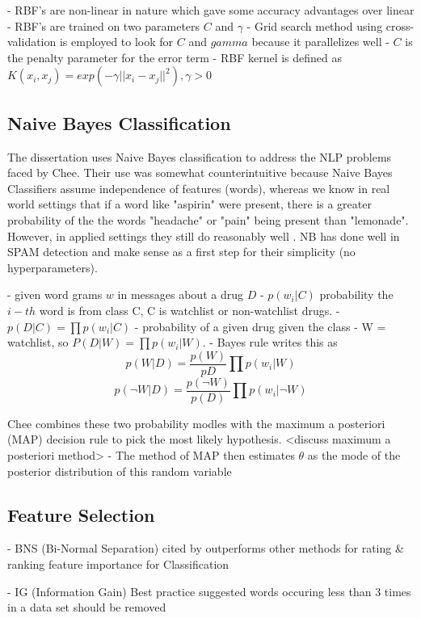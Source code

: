 \documentclass[twoside,11pt]{article}
\begin{document}
- RBF's are non-linear in nature which gave some accuracy advantages over linear
- RBF's are trained on two parameters $C$ and $\gamma$
- Grid search method using cross-validation is employed to look for $C$ and $gamma$
because it parallelizes well
- $C$ is the penalty parameter for the error term
- RBF kernel is defined as $K(x_i, x_j) = exp(-\gamma||x_i - x_j||^{2}), \gamma > 0$

\subsection{Naive Bayes Classification}
The dissertation uses Naive Bayes classification to address the NLP problems
faced by Chee.  Their use was somewhat counterintuitive because Naive Bayes
Classifiers assume independence of features (words), whereas we know in real world settings
that if a word like "aspirin" were present, there is a greater probability of the
the words "headache" or "pain" being present than "lemonade". However, in
applied settings they still do reasonably well \citep{Manning, 1999}. NB has done well
in SPAM detection \citep{Sahami} and make sense as a first step for their simplicity (no
hyperparameters).

- given word grams $w$ in messages about a drug $D$
- $p(w_{i}|C)$ probability the $i-th$ word is from class C, C is watchlist or
non-watchlist drugs.
- $p(D|C) = \prod p(w_{i}|C)$ - probability of a given drug given the class
- W = watchlist, so $P(D|W) = \prod p(w_{i}|W)$.
- Bayes rule writes this as
\[
  p(W|D) = \frac{p(W)}{p{D}} \prod p(w_{i}|W)
\]
\[
  p(\neg{W}|D) = \frac{p(\neg{W})}{p(D)} \prod p(w_{i}|\neg{W})
\]

Chee combines these two probability modles with the maximum a posteriori (MAP)
decision rule to pick the most likely hypothesis.
<discuss maximum a posteriori method>
- The method of MAP then estimates $\theta$ as the mode of the posterior
distribution of this random variable


\subsection{Feature Selection}
- BNS (Bi-Normal Separation) cited by \citep{Forman}
outperforms other methods for rating & ranking feature importance for Classification

- IG (Information Gain)
Best practice suggested words occuring less than 3 times in a data set should be removed
\end{document}
